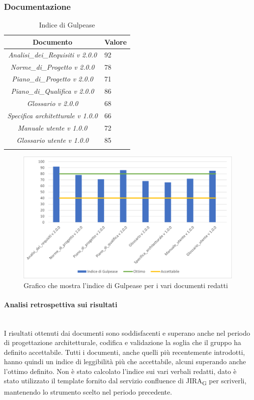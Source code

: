 \subsubsection{Documentazione}
\begin{table}[H]
	\centering
	\setlength\extrarowheight{5pt}
	\renewcommand\tabularxcolumn[1]{>{\Centering}m{#1}}
	\begin{tabularx}{\textwidth}{| c | X |} 
		\hline
		\rowcolor{white}
		\textbf{Documento} & \textbf{Valore}\\
		\hline
		\textit{Analisi\_dei\_Requisiti v 2.0.0} & 92 \\
		\hline
		\textit{Norme\_di\_Progetto v 2.0.0} & 78\\
		\hline
		\textit{Piano\_di\_Progetto v 2.0.0} & 71\\
		\hline
		\textit{Piano\_di\_Qualifica v 2.0.0} & 86\\
		\hline
		\textit{Glossario v 2.0.0} & 68\\
        \hline
		\textit{Specifica architetturale v 1.0.0} & 66\\
        \hline
		\textit{Manuale utente v 1.0.0} & 72\\
         \hline
		\textit{Glossario utente v 1.0.0} & 85\\
		\hline
		\rowcolor{white}
		\caption{Indice di Gulpease}
	\end{tabularx}
\end{table}
\begin{figure}[H]
	\centering
	\includegraphics[scale=0.9]{img/Gulpease2.png}
	\caption{Grafico che mostra l'indice di Gulpease per i vari documenti redatti}
\end{figure}
\paragraph{Analisi retrospettiva sui risultati}\mbox{}\\
I risultati ottenuti dai documenti sono soddisfacenti e superano anche nel periodo di progettazione architetturale, codifica e validazione la soglia che il gruppo ha definito accettabile. Tutti i documenti, anche quelli più recentemente introdotti, hanno quindi un indice di leggibilità più che accettabile, alcuni superando anche l'ottimo definito. Non è stato calcolato l'indice sui vari verbali redatti, dato è stato utilizzato il template fornito dal servizio confluence di JIRA\textsubscript{G} per scriverli, mantenendo lo strumento scelto nel periodo precedente.
